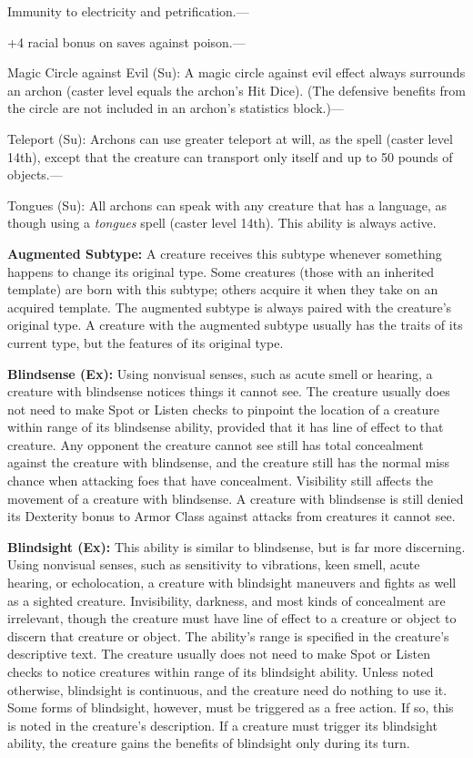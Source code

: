 \documentclass{article}
\begin{document}
Immunity to electricity and petrification.--- 

\parindent=3pt
+4 racial bonus on saves against poison.---

\parindent=0pt
Magic Circle against Evil (Su): A magic circle against evil effect always surrounds 
an archon (caster level equals the archon's Hit Dice). (The defensive benefits 
from the circle are not included in an archon's statistics block.)---

Teleport (Su): Archons can use greater teleport at will, as the spell (caster level 
14th), except that the creature can transport only itself and up to 50 pounds of 
objects.---

Tongues (Su): All archons can speak with any creature that has a language, as though 
using a \textit{tongues }spell (caster level 14th). This ability is always active.

\vspace{12pt}
\textbf{Augmented Subtype:} A creature receives this subtype whenever something 
happens to change its original type. Some creatures (those with an inherited template) 
are born with this subtype; others acquire it when they take on an acquired template. 
The augmented subtype is always paired with the creature's original type. A creature 
with the augmented subtype usually has the traits of its current type, but the 
features of its original type.

\vspace{12pt}
\textbf{Blindsense (Ex):} Using nonvisual senses, such as acute smell or hearing, 
a creature with blindsense notices things it cannot see. The creature usually does 
not need to make Spot or Listen checks to pinpoint the location of a creature within 
range of its blindsense ability, provided that it has line of effect to that creature. 
Any opponent the creature cannot see still has total concealment against the creature 
with blindsense, and the creature still has the normal miss chance when attacking 
foes that have concealment. Visibility still affects the movement of a creature 
with blindsense. A creature with blindsense is still denied its Dexterity bonus 
to Armor Class against attacks from creatures it cannot see.

\vspace{12pt}
\textbf{Blindsight (Ex):} This ability is similar to blindsense, but is far more 
discerning. Using nonvisual senses, such as sensitivity to vibrations, keen smell, 
acute hearing, or echolocation, a creature with blindsight maneuvers and fights 
as well as a sighted creature. Invisibility, darkness, and most kinds of concealment 
are irrelevant, though the creature must have line of effect to a creature or object 
to discern that creature or object. The ability's range is specified in the creature's 
descriptive text. The creature usually does not need to make Spot or Listen checks 
to notice creatures within range of its blindsight ability. Unless noted otherwise, 
blindsight is continuous, and the creature need do nothing to use it. Some forms 
of blindsight, however, must be triggered as a free action. If so, this is noted 
in the creature's description. If a creature must trigger its blindsight ability, 
the creature gains the benefits of blindsight only during its turn.
\end{document}
